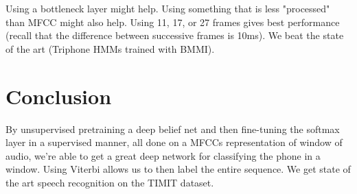 \documentclass[a4paper]{article}
\begin{document}
Using a bottleneck layer might help. Using something that is less "processed"
than MFCC might also help. Using 11, 17, or 27 frames gives best performance
(recall that the difference between successive frames is 10ms). We beat
the state of the art (Triphone HMMs trained with BMMI).

\section{Conclusion}
By unsupervised pretraining a deep belief net and then fine-tuning the softmax
layer in a supervised manner, all done on a MFCCs representation of window
of audio, we're able to get a great deep network for classifying the phone
in a window. Using Viterbi allows us to then label the entire sequence.
We get state of the art speech recognition on the TIMIT dataset.
\end{document}
